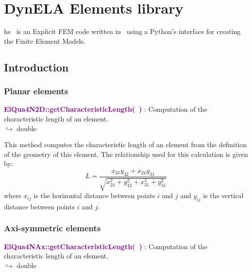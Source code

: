 %
%
%
\chapter{DynELA Elements library}

\startcontents[chapters]
\printmyminitoc[2]he \DynELA~is an Explicit FEM code written in \Cpp~using a Python's interface for creating the Finite Element Models. 

\section{Introduction}

\subsection{Planar elements}

\textcolor{purple}{\textbf{ElQua4N2D::getCharacteristicLength(~)}}\label{ElQua4N2D::getCharacteristicLength()} : Computation of the characteristic length of an element.\\ \hspace*{5mm}$\hookrightarrow$ double

This method computes the characteristic length of an element from the definition of the geometry of this element.
The relationship used for this calculation is given by:
\begin{equation}
L=\frac{x_{31} y_{42}+x_{24} y_{31}}{\sqrt{x_{24}^2+y_{42}^2+x_{31}^2+y_{31}^2}} 
\end{equation}
where $x_{ij}$ is the horizontal distance between points $i$ and $j$ and $y_{ij}$ is the vertical distance between points $i$ and $j$.

\subsection{Axi-symmetric elements}

\textcolor{purple}{\textbf{ElQua4NAx::getCharacteristicLength(~)}}\label{ElQua4NAx::getCharacteristicLength()} : Computation of the characteristic length of an element.\\ \hspace*{5mm}$\hookrightarrow$ double

